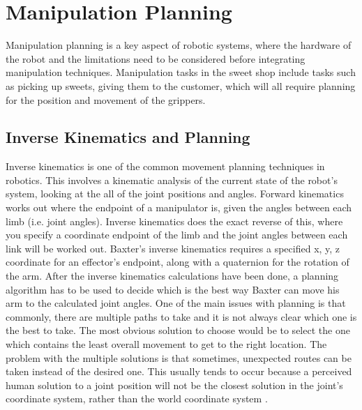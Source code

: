 \section{Manipulation Planning}
Manipulation planning is a key aspect of robotic systems, where the hardware of the robot and the limitations need to be considered before integrating manipulation techniques. Manipulation tasks in the sweet shop include tasks such as picking up sweets, giving them to the customer, which will all require planning for the position and movement of the grippers.
\subsection{Inverse Kinematics and Planning}
Inverse kinematics is one of the common movement planning techniques in robotics. This involves a kinematic analysis of the current state of the robot's system, looking at the all of the joint positions and angles. Forward kinematics works out where the endpoint of a manipulator is, given the angles between each limb (i.e. joint angles). Inverse kinematics does the exact reverse of this, where you specify a coordinate endpoint of the limb and the joint angles between each link will be worked out. Baxter's inverse kinematics requires a specified x, y, z coordinate for an effector's endpoint, along with a quaternion for the rotation of the arm.
\newline\newline
After the inverse kinematics calculations have been done, a planning algorithm has to be used to decide which is the best way Baxter can move his arm to the calculated joint angles. One of the main issues with planning is that commonly, there are multiple paths to take and it is not always clear which one is the best to take. The most obvious solution to choose would be to select the one which contains the least overall movement to get to the right location. The problem with the multiple solutions is that sometimes, unexpected routes can be taken instead of the desired one. This usually tends to occur because a perceived human solution to a joint position will not be the closest solution in the joint's coordinate system, rather than the world coordinate system \cite{robotintro}.
